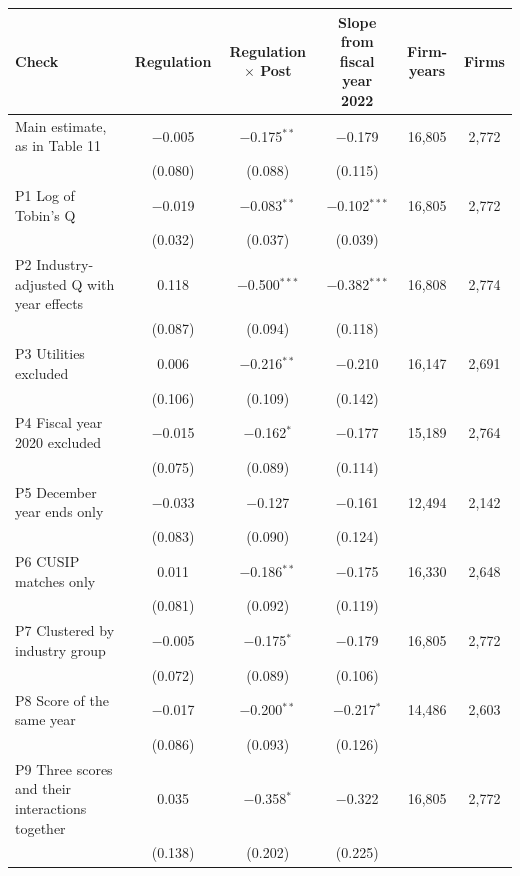\begin{tabular}{lccccc}
\toprule
Check & Regulation & Regulation $\times$ Post & Slope from fiscal year 2022 & Firm-years & Firms \\
\midrule
Main estimate, as in Table 11 & $-$0.005 & $-$0.175$^{**}$ & $-$0.179 & 16,805 & 2,772 \\
 & (0.080) & (0.088) & (0.115) & & \\
\midrule
P1 Log of Tobin's Q & $-$0.019 & $-$0.083$^{**}$ & $-$0.102$^{***}$ & 16,805 & 2,772 \\
 & (0.032) & (0.037) & (0.039) & & \\
P2 Industry-adjusted Q with year effects & 0.118 & $-$0.500$^{***}$ & $-$0.382$^{***}$ & 16,808 & 2,774 \\
 & (0.087) & (0.094) & (0.118) & & \\
P3 Utilities excluded & 0.006 & $-$0.216$^{**}$ & $-$0.210 & 16,147 & 2,691 \\
 & (0.106) & (0.109) & (0.142) & & \\
P4 Fiscal year 2020 excluded & $-$0.015 & $-$0.162$^{*}$ & $-$0.177 & 15,189 & 2,764 \\
 & (0.075) & (0.089) & (0.114) & & \\
P5 December year ends only & $-$0.033 & $-$0.127 & $-$0.161 & 12,494 & 2,142 \\
 & (0.083) & (0.090) & (0.124) & & \\
P6 CUSIP matches only & 0.011 & $-$0.186$^{**}$ & $-$0.175 & 16,330 & 2,648 \\
 & (0.081) & (0.092) & (0.119) & & \\
P7 Clustered by industry group & $-$0.005 & $-$0.175$^{*}$ & $-$0.179 & 16,805 & 2,772 \\
 & (0.072) & (0.089) & (0.106) & & \\
P8 Score of the same year & $-$0.017 & $-$0.200$^{**}$ & $-$0.217$^{*}$ & 14,486 & 2,603 \\
 & (0.086) & (0.093) & (0.126) & & \\
P9 Three scores and their interactions together & 0.035 & $-$0.358$^{*}$ & $-$0.322 & 16,805 & 2,772 \\
 & (0.138) & (0.202) & (0.225) & & \\
\bottomrule
\end{tabular}
